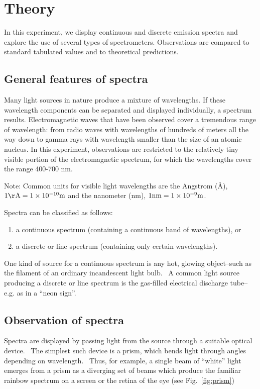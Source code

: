 \section{Theory}
In this experiment, we display continuous and discrete emission spectra
and explore the use of several types of spectrometers.  Observations
are compared to standard tabulated values and to theoretical
predictions.


\subsection{General features of spectra}
Many light sources in nature produce a mixture of wavelengths.  If
these wavelength components can be separated and displayed
individually, a spectrum results.  Electromagnetic waves that have
been observed cover a tremendous range of wavelength: from radio waves
with wavelengths of hundreds of meters all the way down to gamma rays
with wavelength smaller than the size of an atomic nucleus. In this
experiment, observations are restricted to the relatively tiny visible
portion of the electromagnetic spectrum, for which the wavelengths
cover the range 400-700 nm.

Note:  Common units for visible light wavelengths are the Angstrom
({\AA}), $1 {\rm \AA} = 1 \times 10^{-10} {\rm m}$ and the nanometer (nm), $1 {\rm nm} = 1 \times 10^{-9} {\rm m}$. 

Spectra can be classified as follows:

\begin{enumerate}
\item a continuous spectrum (containing a continuous band of
wavelengths), or 
\item a discrete or line spectrum (containing only certain wavelengths).
\end{enumerate}

One kind of source for a continuous spectrum is any hot, glowing
object--such as the filament of an ordinary incandescent light bulb.
\ A common light source producing a discrete or line spectrum is the
gas-filled electrical discharge tube--e.g. as in a
``neon sign''.

\subsection{Observation of spectra}


Spectra are displayed by passing light from the source through a 
suitable optical device. \ The simplest such device is a prism, which
bends light through angles depending on wavelength. \ Thus, for
example, a single beam of ``white'' light
emerges from a prism as a diverging set of beams which produce the
familiar rainbow spectrum on a screen or the retina of the eye (see
Fig.~\ref{fig:prism})

